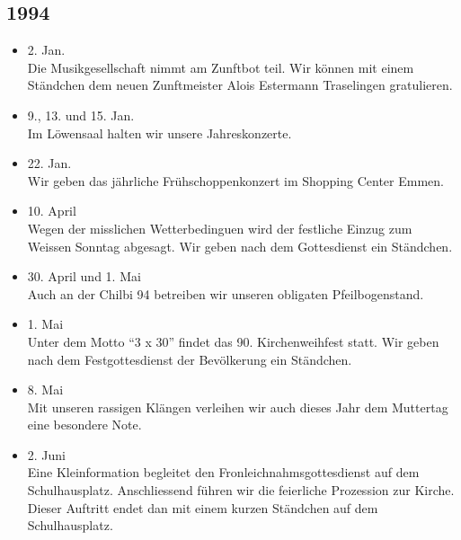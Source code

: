 \subsection*{1994}

\begin{history}


    \begin{itemize}

        \item 2. Jan.\\
              Die Musikgesellschaft nimmt am Zunftbot teil. Wir können mit einem
              Ständchen dem neuen Zunftmeister Alois Estermann Traselingen
              gratulieren.

        \item 9., 13. und 15. Jan.\\
              Im Löwensaal halten wir unsere Jahreskonzerte.

        \item 22. Jan.\\
              Wir geben das jährliche Frühschoppenkonzert im Shopping Center Emmen.

        \item 10. April\\
              Wegen der misslichen Wetterbedinguen wird der festliche Einzug zum
              Weissen Sonntag abgesagt. Wir geben nach dem Gottesdienst ein Ständchen.

        \item 30. April und 1. Mai\\
              Auch an der Chilbi 94 betreiben wir unseren obligaten Pfeilbogenstand.

        \item 1. Mai\\
              Unter dem Motto \enquote{3 x 30} findet das 90. Kirchenweihfest statt.
              Wir geben nach dem Festgottesdienst der Bevölkerung ein Ständchen.

        \item 8. Mai\\
              Mit unseren rassigen Klängen verleihen wir auch dieses Jahr dem
              Muttertag eine besondere Note.

        \item 2. Juni\\
              Eine Kleinformation begleitet den Fronleichnahmsgottesdienst auf dem
              Schulhausplatz. Anschliessend führen wir die feierliche Prozession zur
              Kirche. Dieser Auftritt endet dan mit einem kurzen Ständchen auf dem
              Schulhausplatz.


\end{itemize}
\end{history}

